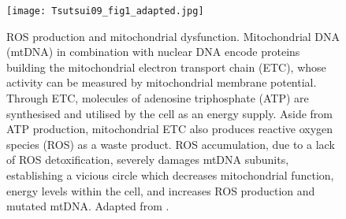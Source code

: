 \clearpage

\begin{figure}[tb]
	\begin{center}
		\texttt{[image: Tsutsui09\_fig1\_adapted.jpg]}
		\caption[ROS production and mitochondrial dysfunction]{ROS production and mitochondrial dysfunction. Mitochondrial DNA (mtDNA) in combination with nuclear DNA encode proteins building the mitochondrial electron transport chain (ETC), whose activity can be measured by mitochondrial membrane potential. Through ETC, molecules of adenosine triphosphate (ATP) are synthesised and utilised by the cell as an energy supply. Aside from ATP production, mitochondrial ETC also produces reactive oxygen species (ROS) as a waste product. ROS accumulation, due to a lack of ROS detoxification, severely damages mtDNA subunits, establishing a vicious circle which decreases mitochondrial function, energy levels within the cell, and increases ROS production and mutated mtDNA. Adapted from \citep[Fig. 1]{Tsutsui2009}.}
		\label{fig:Tsutsui09_fig1_adapted}
	\end{center}
\end{figure}

\clearpage






